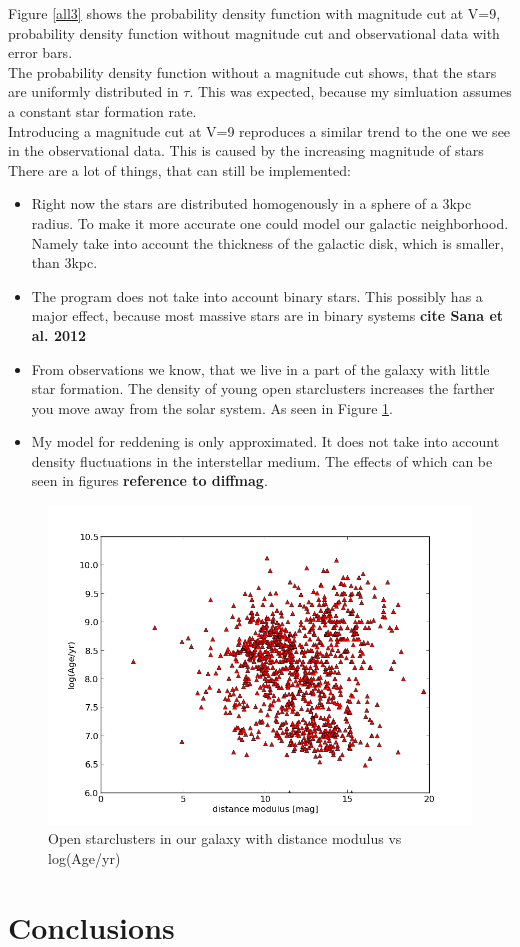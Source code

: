 \documentclass[a4paper,10pt]{article}
\begin{document}
 Figure \ref{all3} shows the probability density function with magnitude cut at V=9, probability density function without 
 magnitude cut and observational data with error bars.\\
 The probability density function without a magnitude cut shows, that the stars are uniformly distributed in $\tau$. This was expected,
 because my simluation assumes a constant star formation rate.\\
 Introducing a magnitude cut at V=9 reproduces a similar trend to the one we see in the observational data. This is caused by the increasing
 magnitude of stars
 There are a lot of things, that can still be implemented:\\
 \begin{itemize}
  \item Right now the stars are distributed homogenously in a sphere of a 3kpc radius. To make it more accurate one could model our
  galactic neighborhood. Namely take into account the thickness of the galactic disk, which is smaller, than 3kpc.
  \item The program does not take into account binary stars. This possibly has a major effect, because most massive stars are in binary
  systems \textbf{cite Sana et al. 2012}
  \item From observations we know, that we live in a part of the galaxy with little star formation.  
  The density of young open starclusters increases the farther you move away from the solar system. As seen in Figure \ref{clusters}.
  \item My model for reddening is only approximated. It does not take into account density fluctuations in the interstellar medium. 
  The effects of which can be seen in figures \textbf{reference to diffmag}.
 \end{itemize}
 \begin{figure}[h!]
  \includegraphics[width=\textwidth]{clusters}
  \caption{Open starclusters in our galaxy with distance modulus vs log(Age/yr)  \label{clusters}}
 \end{figure}

 
 \section{Conclusions}
 
 
 
 
\end{document}
